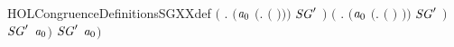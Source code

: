 \begin{SaveVerbatim}{HOLCongruenceDefinitionsSGXXdef}
                 \ensuremath{(}\HOLSymConst{\HOLTokenExists{}} . \ensuremath{(}\ensuremath{\HOLBoundVar{a}\sb{\mathrm{0}}} \HOLSymConst{\ensuremath{=}} \ensuremath{(}\HOLTokenLambda{}.   \ensuremath{(} \ensuremath{)}\ensuremath{)}\ensuremath{)} \HOLSymConst{\HOLTokenConj{}} \ensuremath{\HOLBoundVar{SG}\sp{\prime}} \ensuremath{)} \HOLSymConst{\HOLTokenDisj{}}
                 \ensuremath{(}\HOLSymConst{\HOLTokenExists{}} . \ensuremath{(}\ensuremath{\HOLBoundVar{a}\sb{\mathrm{0}}} \HOLSymConst{\ensuremath{=}} \ensuremath{(}\HOLTokenLambda{}.  \ensuremath{(} \ensuremath{)} \ensuremath{)}\ensuremath{)} \HOLSymConst{\HOLTokenConj{}} \ensuremath{\HOLBoundVar{SG}\sp{\prime}} \ensuremath{)} \HOLSymConst{\HOLTokenImp{}}
                 \ensuremath{\HOLBoundVar{SG}\sp{\prime}} \ensuremath{\HOLBoundVar{a}\sb{\mathrm{0}}}\ensuremath{)} \HOLSymConst{\HOLTokenImp{}}
            \ensuremath{\HOLBoundVar{SG}\sp{\prime}} \ensuremath{\HOLBoundVar{a}\sb{\mathrm{0}}}\ensuremath{)}
\end{SaveVerbatim}
\newcommand{\HOLCongruenceDefinitionsSGXXdef}{\UseVerbatim{HOLCongruenceDefinitionsSGXXdef}}
